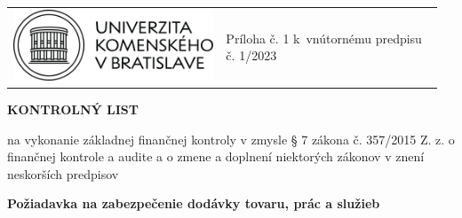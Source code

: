 \documentclass[10pt,a4paper]{article}
\begin{document}
\begin{table}[h!]
\centering
\begin{tabular}{p{0.475\linewidth} p{0.48\linewidth}}
	\includegraphics[width=0.475\linewidth]{images/uk_logo} & \parbox[t]{\linewidth}{\raggedleft \vspace*{-3.5em} Príloha č. 1 k vnútornému predpisu č. 1/2023} \\
\end{tabular}
\end{table}

\vspace*{-1em}

{\large\bf KONTROLNÝ LIST}

na vykonanie základnej finančnej kontroly v zmysle § 7 zákona č. 357/2015 Z. z. o finančnej kontrole a audite a o zmene a doplnení niektorých zákonov v znení neskorších predpisov

\vspace*{0.5em}

{\bf Požiadavka na zabezpečenie dodávky tovaru, prác a služieb}
\vspace*{-1em}
\end{document}
